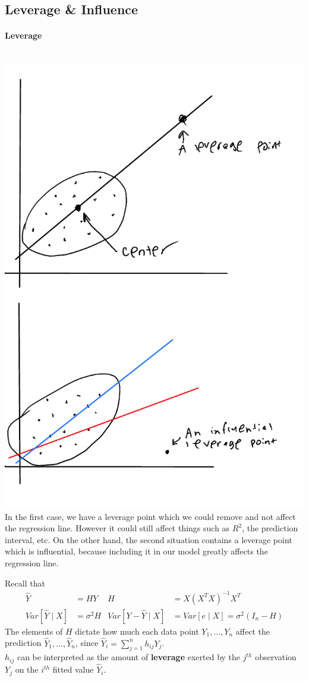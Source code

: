 \documentclass[12 pt]{article}
\begin{document}
\subsection{Leverage \& Influence}
\paragraph{Leverage}
~\\\includegraphics[width=.5\textwidth]{33.pdf}
\\ In the first case, we have a leverage point which we could remove
and not affect the regression line. However it could still affect
things such as $R^2$, the prediction interval, etc. On the other hand,
the second situation contains a leverage point which is influential,
because including it in our model greatly affects the regression line.

Recall that
\begin{align*}
  \hat{Y} & = HY & H & = X(X^TX)^{-1}X^T
  \\ Var[\hat{Y} \mid X] & = \sigma^2 H & Var[Y - \hat{Y} \mid X] & = Var[e \mid X] = \sigma^2 (I_n - H)
\end{align*}
The elements of $H$ dictate how much each data point $Y_1, \ldots,
Y_n$ affect the prediction $\hat{Y}_1, \ldots, \hat{Y}_n$, since
$\hat{Y}_i = \sum_{j=1}^n h_{ij}Y_j$.
\\ $h_{ij}$ can be interpreted as the amount of \textbf{leverage}
exerted by the $j^{th}$ observation $Y_j$ on the $i^{th}$ fitted value
$\hat{Y}_i$.
\end{document}
